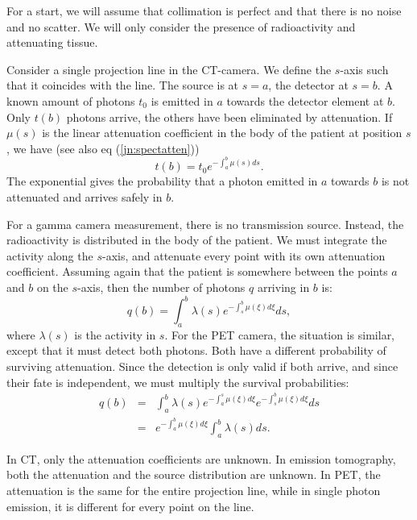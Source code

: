 For a start, we will assume that collimation is perfect and that there is no
noise and no scatter. We will only consider the presence of radioactivity
and attenuating tissue.

Consider a single projection line in the CT-camera. We define the $s$-axis
such that it coincides with the line. The source is at $s=a$, the detector at
$s = b$. A known amount of photons $t_0$ is emitted in $a$ towards the
detector element at $b$. Only $t(b)$ photons arrive, the others have been
eliminated by attenuation. If $\mu(s)$ is the linear attenuation coefficient
in the body of the patient at position $s$, we have (see also eq
(\ref{jn:spectatten}))
\begin{equation}
  t(b) = t_0 e^{- \int_a^b \mu(s) ds}. \label{eq:ct_proj}
\end{equation}
The exponential gives the probability that a photon emitted in $a$ towards $b$
is not attenuated and arrives safely in $b$.

For a gamma camera measurement, there is no transmission source. Instead, the
radioactivity is distributed in the body of the patient. We must integrate the
activity along the $s$-axis, and attenuate every point with its own
attenuation coefficient. Assuming again that the patient is somewhere between
the points $a$ and $b$ on the $s$-axis, then the number of photons $q$ arriving
in $b$ is:
\begin{equation}
  q(b) = \int_a^b \lambda(s) e^{- \int_s^b \mu(\xi) d\xi} ds,
   \label{eq:spect_proj}
\end{equation}
where $\lambda(s)$ is the activity in $s$.
For the PET camera, the situation is similar, except that it must detect both
photons. Both have a different probability of surviving attenuation. Since the
detection is only valid if both arrive, and since their fate is independent,
we must multiply the survival probabilities:
\begin{align}
  q(b) & = & \int_a^b \lambda(s) e^{- \int_a^s \mu(\xi) d\xi} 
                             e^{- \int_s^b \mu(\xi) d\xi} ds \\
  & = & e^{- \int_a^b \mu(\xi) d\xi} \int_a^b \lambda(s) ds.
        \label{eq:pet_proj}
\end{align}

In CT, only the attenuation coefficients are unknown. In emission tomography,
both the attenuation and the source distribution are unknown. In PET, the
attenuation is the same for the entire projection line, while in single photon
emission, it is different for every point on the line.


